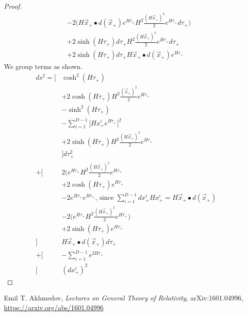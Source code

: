 \documentclass[]{article}
\begin{document}
\begin{proof}
\begin{align*}
	&-2\big(H\vec{x}_+\bullet d(\vec{x}_+)e^{H\tau_+} H^2\frac{(H\vec{x}_+)^2}{2}e^{H\tau_+}d\tau_+\big)\\
	&+2\sinh(H\tau_+)d\tau_+ H^2\frac{(H\vec{x}_+)^2}{2}e^{H\tau_+}d\tau_+\\
	&+2\sinh(H\tau_+)d\tau_+ H\vec{x}_+\bullet d(\vec{x}_+)e^{H\tau_+} 	
	\end{align*}
	We group terms as shown.
	\begin{align*}
	ds^2=\big[&\cosh^2(H\tau_+)\\
	&+ 2\cosh(H\tau_+) H^2\frac{(\vec{x}_+)^2}{2}e^{H\tau_+}\\
	&-\sinh^2(H\tau_+)\\
	&- \sum_{i=1}^{D-1}\bigg[ H x^i_+e^{H\tau_+}\bigg]^2\\
	&+2\sinh(H\tau_+) H^2\frac{(H\vec{x}_+)^2}{2}e^{H\tau_+}\\	
	&\big] d\tau_+^2\\
	+\big[&2\big(e^{H\tau_+} H^2\frac{(H\vec{x}_+)^2}{2}e^{H\tau_+}\\
	&+2\cosh(H\tau_+) e^{H\tau_+}\\
	&- 2e^{H\tau_+}  e^{H\tau_+}\text{, since $\sum_{i=1}^{D-1}dx^i_+ H x^i_+=H\vec{x}_+\bullet d(\vec{x}_+)$}\\
	&-2\big(e^{H\tau_+} H^2\frac{(H\vec{x}_+)^2}{2}e^{H\tau_+}\big)\\
	&+2\sinh(H\tau_+)e^{H\tau_+}\\
	\big]&H\vec{x}_+\bullet d(\vec{x}_+)d\tau_+\\
	+\big[&- \sum_{i=1}^{D-1}e^{2H\tau_+}\\
	\big]&(dx^i_+)^2
	\end{align*}
	

\end{proof}
\begin{thebibliography}{9}\label{section:biblio}
	\raggedright
	Emil T. Akhmedov,
	\emph{Lectures on General Theory of Relativity},
	arXiv:1601.04996,
	\url{https://arxiv.org/abs/1601.04996}
\end{thebibliography}
\end{document}

